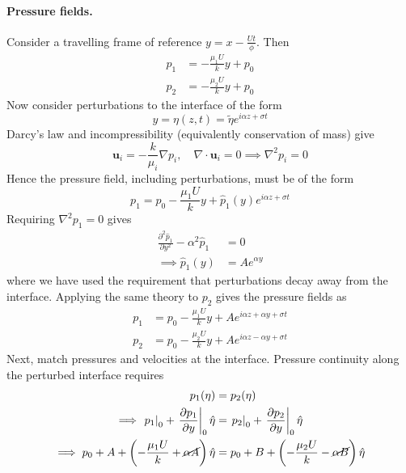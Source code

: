 \documentclass{jknotes}
\renewcommand{\u}{\symbf{u}}
\begin{document}
\paragraph{Pressure fields.}
Consider a travelling frame of reference $y = x-\frac{Ut}{\phi}$. Then
\begin{align}
	p_1 &= -\frac{\mu_1 U}{k} y + p_0 \\
	p_2 &= -\frac{\mu_2 U}{k} y + p_0
\end{align}
Now consider perturbations to the interface of the form
\begin{equation}
	y = \eta(z,t) = \tilde{\eta} e^{i\alpha z + \sigma t}
\end{equation}
Darcy's law and incompressibility (equivalently conservation of mass) give
\begin{equation}
	\u_i = -\frac{k}{\mu_i} \nabla p_i, \hspace{1em} \nabla \cdot \u_i = 0
	 	 \implies \nabla^2 p_i = 0
\end{equation}
Hence the pressure field, including perturbations, must be of the form
\begin{equation}
	p_1 = p_0 - \frac{\mu_1 U}{k}y + \hat{p}_1(y)e^{i\alpha z + \sigma t}
\end{equation}
Requiring $\nabla^2 p_1 = 0$ gives
\begin{align}
	\frac{\partial^2 \hat{p}_1}{\partial y^2} - \alpha^2 \hat{p}_1 &= 0 \\
	\implies \hat{p}_1(y) &= Ae^{\alpha y} 
\end{align}
where we have used the requirement that perturbations decay away from the
interface. Applying the same theory to $p_2$ gives the pressure fields as
\begin{align}
	p_1 &= p_0 - \frac{\mu_1 U}{k} y + Ae^{i\alpha z + \alpha y + \sigma t} \\
	p_2 &= p_0 - \frac{\mu_2 U}{k} y + Ae^{i\alpha z - \alpha y + \sigma t}
\end{align}
Next, match pressures and velocities at the interface. Pressure continuity
along the perturbed interface requires
\begin{align}
	p_1(\eta) &= p_2(\eta)\\
	\implies \left.p_1 \right|_0 + \left. \frac{\partial p_1}{\partial
y}\right|_0 \hat{\eta} &= \left.p_2 \right|_0 + \left. \frac{\partial p_2}{\partial
y}\right|_0 \hat{\eta} \\
\implies p_0 + A + \left(-\frac{\mu_1 U}{k} + \cancel{\alpha
A}\right)\hat{\eta} &= 
p_0 + B + \left(-\frac{\mu_2 U}{k} - \cancel{\alpha
B}\right)\hat{\eta}
\end{align}
\end{document}
